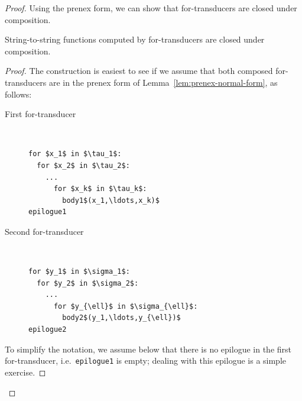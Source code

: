 \begin{proof}
    Using the prenex  form, we can show that for-transducers are closed under composition.

\begin{lemma}\label{lem:for-closed-under-composition}
    String-to-string functions computed by for-transducers are closed under composition.
\end{lemma}
\begin{proof}
    The construction is easiest to see if we assume that both composed for-transducers are in the prenex  form of Lemma~\ref{lem:prenex-normal-form}, as follows:
\begin{description}
  \item[First for-transducer] \ 
    \begin{lstlisting}
for $x_1$ in $\tau_1$:
  for $x_2$ in $\tau_2$:
    ...
      for $x_k$ in $\tau_k$:
        body1$(x_1,\ldots,x_k)$
epilogue1
            \end{lstlisting}
            \item[Second for-transducer] \ 
\begin{lstlisting}
for $y_1$ in $\sigma_1$:
  for $y_2$ in $\sigma_2$:
    ...
      for $y_{\ell}$ in $\sigma_{\ell}$:
        body2$(y_1,\ldots,y_{\ell})$
epilogue2
            \end{lstlisting}
            \end{description}    
    
    To simplify the notation, we assume below that there is no epilogue in the first for-transducer, i.e.~{\tt epilogue1} is empty; dealing with this epilogue is a simple exercise.   
 

\end{proof}
\end{proof}
